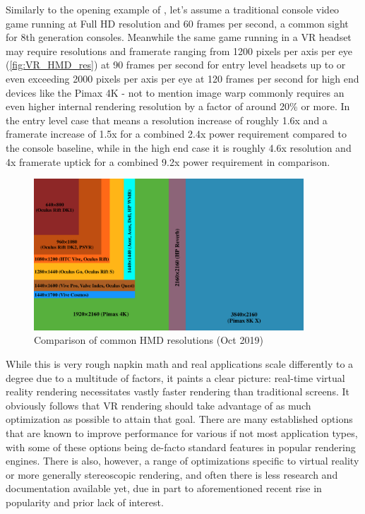 Similarly to the opening example of \cite{InigoQuilez.2017}, let's assume a traditional console video game running at Full HD resolution and 60 frames per second, a common sight for 8th generation consoles. Meanwhile the same game running in a VR headset may require resolutions and framerate ranging from 1200 pixels per axis per eye (\autoref{fig:VR_HMD_res}) at 90 frames per second for entry level headsets up to or even exceeding 2000 pixels per axis per eye at 120 frames per second for high end devices like the Pimax 4K - not to mention image warp commonly requires an even higher internal rendering resolution by a factor of around 20\% or more. In the entry level case that means a resolution increase of roughly 1.6x and a framerate increase of 1.5x for a combined 2.4x power requirement compared to the console baseline, while in the high end case it is roughly 4.6x resolution and 4x framerate uptick for a combined 9.2x power requirement in comparison. \\

\begin{figure}[htb]
  \centering
  \includegraphics[width=0.9\textwidth]{pictures/VR_headset_resolution_per_eye_comparison}
  \caption{Comparison of common HMD resolutions (Oct 2019)\cite{VeikkoMakela.2019}} \label{fig:VR_HMD_res}
\end{figure} 

While this is very rough napkin math and real applications scale differently to a degree due to a multitude of factors, it paints a clear picture: real-time virtual reality rendering necessitates vastly faster rendering than traditional screens. It obviously follows that VR rendering should take advantage of as much optimization as possible to attain that goal. There are many established options that are known to improve performance for various if not most application types, with some of these options being de-facto standard features in popular rendering engines.  There is also, however, a range of optimizations specific to virtual reality or more generally stereoscopic rendering, and often there is less research and documentation available yet, due in part to aforementioned recent rise in popularity and prior lack of interest. \\

